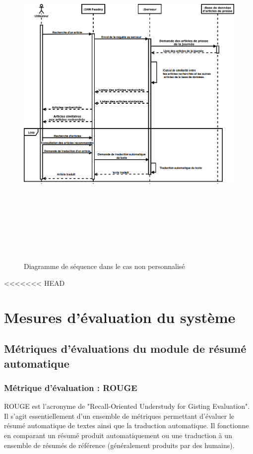 \begin{figure}[H]
    \centering
    \includegraphics[height=500pt,width=425pt]{img/chapter3/diagseqnonperso.png}
    \caption{Diagramme de séquence dans le cas non personnalisé}
\end{figure}

<<<<<<< HEAD





\section{Mesures d'évaluation du système}

\subsection{Métriques d'évaluations du module de résumé automatique}

\subsubsection{Métrique d'évaluation : ROUGE\label{metrique-eval}}
ROUGE est l'acronyme de "Recall-Oriented Understudy for Gisting Evaluation". Il s'agit essentiellement d'un ensemble de métriques permettant d'évaluer le résumé automatique de textes ainsi que la traduction automatique. Il fonctionne en comparant un résumé produit automatiquement ou une traduction à un ensemble de résumés de référence (généralement produits par des humains). \cite{rouge0}

